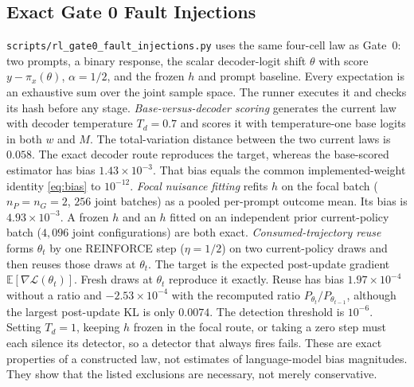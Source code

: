 \documentclass{article}
\begin{document}
\subsection{Exact Gate 0 Fault Injections}
\label{app:gate0}
\texttt{scripts/rl\_gate0\_fault\_injections.py} uses the same four-cell law
as Gate~0: two prompts, a binary response, the scalar decoder-logit shift
$\theta$ with score $y-\pi_x(\theta)$, $\alpha=1/2$, and the frozen $h$ and
prompt baseline. Every expectation is an exhaustive sum over the joint sample
space. The runner executes it and checks its hash before any stage.
\emph{Base-versus-decoder scoring} generates the current law with decoder
temperature $T_d=0.7$ and scores it with temperature-one base logits in both
$w$ and $M$. The total-variation distance between the two current laws is
$0.058$. The exact decoder route reproduces the target, whereas the
base-scored estimator has bias $1.43\times10^{-3}$. That bias equals the
common implemented-weight identity \cref{eq:bias} to $10^{-12}$.
\emph{Focal nuisance fitting} refits $h$ on the focal batch ($n_P=n_G=2$,
$256$ joint batches) as a pooled per-prompt outcome mean. Its bias is
$4.93\times10^{-3}$. A frozen $h$ and an $h$ fitted on an independent prior
current-policy batch ($4{,}096$ joint configurations) are both exact.
\emph{Consumed-trajectory reuse} forms $\theta_t$ by one REINFORCE step
($\eta=1/2$) on two current-policy draws and then reuses those draws at
$\theta_t$. The target is the expected post-update gradient
$\mathbb E[\nabla\mathcal L(\theta_t)]$. Fresh draws at $\theta_t$
reproduce it exactly. Reuse has bias $1.97\times10^{-4}$ without a ratio and
$-2.53\times10^{-4}$ with the recomputed ratio
$P_{\theta_t}/P_{\theta_{t-1}}$, although the largest post-update KL is only
$0.0074$. The detection threshold is $10^{-6}$. Setting $T_d=1$, keeping $h$
frozen in the focal route, or taking a zero step must each silence its
detector, so a detector that always fires fails. These are exact properties of
a constructed law, not estimates of language-model bias magnitudes. They show
that the listed exclusions are necessary, not merely conservative.
\end{document}
